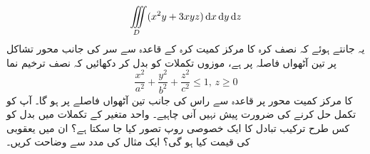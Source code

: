 \[\iiint\limits_D (x^2y+3xyz)\dif x\dif y\dif z\]
یہ جانتے ہوئے کہ  نصف کرہ کا مرکز کمیت کرہ  کے قاعدہ سے   سر کی   جانب محور تشاکل پر   تین آٹھواں فاصلہ پر ہے،  موزوں تکملات کو بدل کر دکھائیں کہ نصف  ترخیم نما 
\[\frac{x^2}{a^2}+\frac{y^2}{b^2}+\frac{z^2}{c^2}\le 1,\, z\ge 0\]
کا مرکز کمیت  محور  پر قاعدہ سے راس کی  جانب تین آٹھواں فاصلے  پر ہو گا۔ آپ کو تکمل حل کرنے کی ضرورت پیش نہیں آنی چاہیے۔
واحد متغیر کے تکملات  میں بدل کو کس طرح ترکیب تبادل کا ایک خصوصی روپ تصور کیا جا سکتا ہے؟ ان میں یعقوبی کی قیمت کیا ہو گی؟ ایک مثال کی مدد سے وضاحت کریں۔

